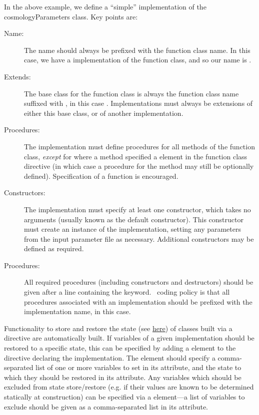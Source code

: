 In the above example, we define a ``simple'' implementation of the {\normalfont cosmologyParameters} class. Key points are:
\begin{description}
\item[Name:] The name should always be prefixed with the function class name. In this case, we have a  implementation of the  function class, and so our name is .
\item[Extends:] The base class for the function class is always the function class name suffixed with , in this case . Implementations must always be extensions of either this base class, or of another implementation.
\item[Procedures:] The implementation must define procedures for all methods of the function class, \emph{except} for where a method specified a  element in the function class directive (in which case a procedure for the method may still be optionally defined). Specification of a  function is encouraged.
\item[Constructors:] The implementation must specify at least one constructor, which takes no arguments (usually known as the default constructor). This constructor must create an instance of the implementation, setting any parameters from the input parameter file as necessary. Additional constructors may be defined as required.
\item[Procedures:] All required procedures (including constructors and destructors) should be given after a line containing the  keyword. \glc\ coding policy is that all procedures associated with an implementation should be prefixed with the implementation name,  in this case.
\end{description}

Functionality to store and restore the state (see \href{https://github.com/galacticusorg/galacticus/releases/download/bleeding-edge/Galacticus_Usage.pdf\#sec.Restarting}{here}) of classes built via a  directive are automatically built. If variables of a given implementation should be restored to a specific state, this can be specified by adding a  element to the directive declaring the implementation. The  element should specify a comma-separated list of one or more variables to set in its  attribute, and the state to which they should be restored in its  attribute. Any variables which should be excluded from state store/restore (e.g. if their values are known to be determined statically at construction) can be specified via a  element---a list of variables to exclude should be given as a comma-separated list in its  attribute.

